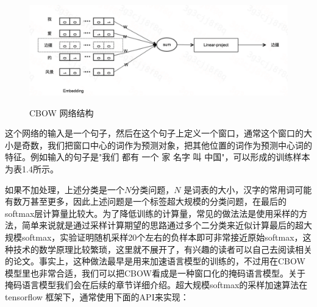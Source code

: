 \documentclass[twoside,a4paper,12pt]{book}%
\begin{document}
\begin{figure}[htbp]
\begin{center}
\includegraphics[width=5.5in]{figures/cbow1.png}
\caption{CBOW 网络结构}\label{fig:cbow1}
\label{fig:cbow1}
\end{center}
\end{figure}

这个网络的输入是一个句子，然后在这个句子上定义一个窗口，通常这个窗口的大小是奇数，我们把窗口中心的词作为预测对象，把其他位置的词作为预测中心词的特征。例如输入的句子是"我们 都有 一个 家 名字 叫 中国"，可以形成的训练样本为表1.4所示。
\begin{table} [h]

	\label{tab:schedule}
	\centering
\caption{可用特征构造}  
\end{table}  

如果不加处理，上述分类是一个$N$分类问题，$N$ 是词表的大小，汉字的常用词可能有数万甚至更多，因此上述问题是一个标签超大规模的分类问题，在最后的softmax层计算量比较大。为了降低训练的计算量，常见的做法法是使用采样的方法，简单来说就是通过采样计算期望的思路通过多个二分类来近似计算最后的超大规模softmax，实验证明随机采样20个左右的负样本即可非常接近原始softmax，这种技术的数学原理比较繁琐，这里就不展开了，有兴趣的读者可以自己去阅读相关的论文。事实上，这种做法最早是用来加速语言模型的训练的，不过用在\gls{CBOW}模型里也非常合适，我们可以把\gls{CBOW}看成是一种窗口化的掩码语言模型。关于掩码语言模型我们会在后续的章节详细介绍。超大规模softmax的采样加速算法在tensorflow 框架下，通常使用下面的API来实现：
\end{document}
